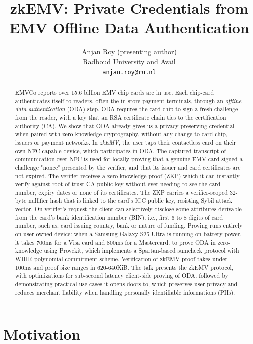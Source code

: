 \documentclass[10pt,a4paper]{article}
\title{zkEMV: Private Credentials from EMV Offline Data Authentication}
\author{Anjan Roy (presenting author)\\Radboud University and Avail\\\texttt{anjan.roy@ru.nl}}
\date{}
\begin{document}
\maketitle

\begin{abstract}
  EMVCo reports over 15.6 billion EMV chip cards are in use.
  Each chip-card authenticates itself to readers, often the in-store payment terminals, through an \emph{offline data authentication} (ODA) step.
  ODA requires the card chip to sign a fresh challenge from the reader, with a key that an RSA certificate chain ties to the certification authority (CA).
  We show that ODA already gives us a privacy-preserving credential when paired with zero-knowledge cryptography, without any change to card chip, issuers or payment networks.
  In \emph{zkEMV}, the user taps their contactless card on their own NFC-capable device, which participates in ODA.
  The captured transcript of communication over NFC is used for locally proving that a genuine EMV card signed a challenge "nonce" presented by the verifier, and that its issuer and card certificates are not expired.
  The verifier receives a zero-knowledge proof (ZKP) which it can instantly verify against root of trust CA public key without ever needing to see the card number, expiry dates or none of its certificates.
  The ZKP carries a verifier-scoped 32-byte nullifier hash that is linked to the card's ICC public key, resisting Sybil attack vector.
  On verifier's request the client can selectively disclose some attributes derivable from the card's bank identification number (BIN), i.e., first 6 to 8 digits of card number, such as, card issuing country, bank or nature of funding.
  Proving runs entirely on user-owned device: when a Samsung Galaxy S25 Ultra is running on battery power, it takes 700ms for a Visa card and 800ms for a Mastercard, to prove ODA in zero-knowledge using Provekit, which implements a Spartan-based sumcheck protocol with WHIR polynomial commitment scheme.
  Verification of zkEMV proof takes under 100ms and proof size ranges in 620-640KiB.
  The talk presents the zkEMV protocol, with optimizations for sub-second latency client-side proving of ODA, followed by demonstrating practical use cases it opens doors to, which preserves user privacy and reduces merchant liability when handling personally identifiable informations (PIIs).
\end{abstract}

\section{Motivation}
\end{document}
